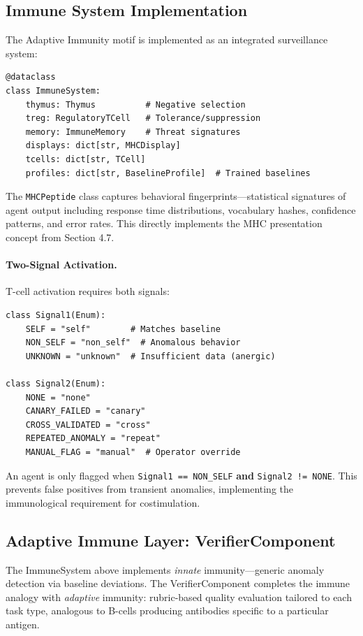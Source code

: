 \subsection{Immune System Implementation}

The Adaptive Immunity motif is implemented as an integrated surveillance system:

\begin{verbatim}
@dataclass
class ImmuneSystem:
    thymus: Thymus          # Negative selection
    treg: RegulatoryTCell   # Tolerance/suppression
    memory: ImmuneMemory    # Threat signatures
    displays: dict[str, MHCDisplay]
    tcells: dict[str, TCell]
    profiles: dict[str, BaselineProfile]  # Trained baselines
\end{verbatim}

The \texttt{MHCPeptide} class captures behavioral fingerprints---statistical signatures of agent output
including response time distributions, vocabulary hashes, confidence patterns, and error rates. This
directly implements the MHC presentation concept from Section 4.7.

\paragraph{Two-Signal Activation.}
T-cell activation requires both signals:
\begin{verbatim}
class Signal1(Enum):
    SELF = "self"        # Matches baseline
    NON_SELF = "non_self"  # Anomalous behavior
    UNKNOWN = "unknown"  # Insufficient data (anergic)

class Signal2(Enum):
    NONE = "none"
    CANARY_FAILED = "canary"
    CROSS_VALIDATED = "cross"
    REPEATED_ANOMALY = "repeat"
    MANUAL_FLAG = "manual"  # Operator override
\end{verbatim}

An agent is only flagged when \texttt{Signal1 == NON\_SELF} \textbf{and} \texttt{Signal2 != NONE}.
This prevents false positives from transient anomalies, implementing the immunological requirement
for costimulation.

\subsection{Adaptive Immune Layer: VerifierComponent}

The ImmuneSystem above implements \emph{innate} immunity---generic anomaly detection via baseline
deviations.  The VerifierComponent completes the immune analogy with \emph{adaptive} immunity:
rubric-based quality evaluation tailored to each task type, analogous to B-cells producing
antibodies specific to a particular antigen.

